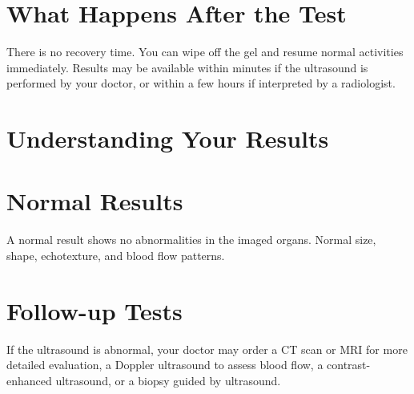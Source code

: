 \section*{What Happens After the Test}
There is no recovery time. You can wipe off the gel and resume normal activities immediately. Results may be available within minutes if the ultrasound is performed by your doctor, or within a few hours if interpreted by a radiologist.

\section*{Understanding Your Results}

\section*{Normal Results}
A normal result shows no abnormalities in the imaged organs. Normal size, shape, echotexture, and blood flow patterns.

\section*{Follow-up Tests}
If the ultrasound is abnormal, your doctor may order a CT scan or MRI for more detailed evaluation, a Doppler ultrasound to assess blood flow, a contrast-enhanced ultrasound, or a biopsy guided by ultrasound.
